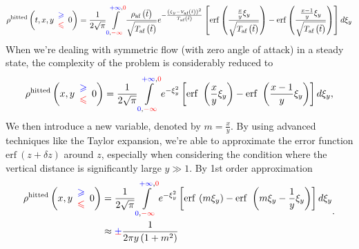 \begin{equation*}
\rho ^{\text{hitted}}\left(
t,x,y\begin{array}{ c }
\textcolor[rgb]{0,0,1}{\geqslant }\\
\textcolor[rgb]{1,0,0}{\leqslant }
\end{array} 0
\right)
=
\frac{1}{2\sqrt{\pi }}\int\limits _{\textcolor[rgb]{0,0,1}{0} ,\textcolor[rgb]{1,0,0}{-\infty }}^{\textcolor[rgb]{0,0,1}{+\infty } ,\textcolor[rgb]{1,0,0}{0}}\frac{\rho _{\text{af}}\left(\tilde{t}\right)}{\sqrt{T_{\text{af}}\left(\tilde{t}\right)}} e^{-\frac{\left( \xi _{y} -V_{\text{af}}\left(\tilde{t}\right)\right)^{2}}{T_{\text{af}}\left(\tilde{t}\right)}}\left[\mathrm{erf}\left(\frac{\frac{x}{y} \xi _{y}}{\sqrt{T_{\text{af}}\left(\tilde{t}\right)}}\right) -\mathrm{erf}\left(\frac{\frac{x-1}{y} \xi _{y}}{\sqrt{T_{\text{af}}\left(\tilde{t}\right)}}\right)\right] d\xi _{y}
\end{equation*}
When we're dealing with symmetric flow (with zero angle of attack) in a steady state, the complexity of the problem is considerably reduced to
\begin{equation*}
\rho ^{\text{hitted}}\left(
x,y\begin{array}{ c }
\textcolor[rgb]{0,0,1}{\geqslant }\\
\textcolor[rgb]{1,0,0}{\leqslant }
\end{array} 0
\right)
=
\frac{1}{2\sqrt{\pi }}\int\limits _{\textcolor[rgb]{0,0,1}{0} ,\textcolor[rgb]{1,0,0}{-\infty }}^{\textcolor[rgb]{0,0,1}{+\infty } ,\textcolor[rgb]{1,0,0}{0}}e^{-\xi _{y}^{2}}\left[\mathrm{erf} \ \left(\frac{x}{y} \xi _{y}\right) -\mathrm{erf} \ \left(\frac{x-1}{y} \xi _{y}\right)\right] d\xi _{y}
,
\end{equation*}
We then introduce a new variable, denoted by $m=\frac{x}{y}$. By using advanced techniques like the Taylor expansion, we're able to approximate the error function $\mathrm{erf} \ ( z+\delta z)$ around $z$, especially when considering the condition where the vertical distance is significantly large $y \gg 1$. By 1st order approximation
\begin{equation*}
\begin{aligned}
\rho ^{\text{hitted}}\left(
x,y\begin{array}{ c }
\textcolor[rgb]{0,0,1}{\geqslant }\\
\textcolor[rgb]{1,0,0}{\leqslant }
\end{array} 0
\right)
& =
\frac{1}{2\sqrt{\pi }}\int\limits _{\textcolor[rgb]{0,0,1}{0} ,\textcolor[rgb]{1,0,0}{-\infty }}^{\textcolor[rgb]{0,0,1}{+\infty } ,\textcolor[rgb]{1,0,0}{0}}
e^{-\xi _{y}^{2}}\left[\mathrm{erf} \ ( m\xi _{y}) -\mathrm{erf} \ \left( m\xi _{y} -\frac{1}{y} \xi _{y}\right)\right] d\xi _{y}\\
 & \approx \cpm \frac{1}{2\pi y\left( 1+m^{2}\right)}
\end{aligned}
.
\end{equation*}

